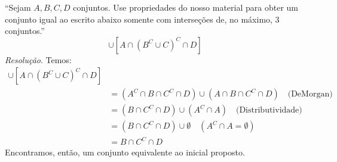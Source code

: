 \enquote{Sejam $A, B, C, D$ conjuntos. Use propriedades do nosso material para obter um conjunto igual ao escrito abaixo somente com interseções de, no máximo, 3 conjuntos.}
\begin{displaymath}
    [A^C \cap B \cap (C \cup D^C)^C] \cup [A \cap (B^C \cup C)^C \cap D]
\end{displaymath}
\emph{Resolução}. Temos:
\begin{align*}
    [A^C \cap B &\cap (C \cup D^C)^C] \cup [A \cap (B^C \cup C)^C \cap D] 
    \\ &=
    (A^C \cap B \cap C^C \cap D) \cup (A \cap B \cap C^C \cap D) \quad \text{(DeMorgan)}
    \\ &=
    (B \cap C^C \cap D) \cup (A^C \cap A) \quad \text{(Distributividade)}
    \\ &=
    (B \cap C^C \cap D) \cup \emptyset \quad (A^C \cap A = \emptyset) 
    \\ &= 
    B \cap C^C \cap D
\end{align*}
Encontramos, então, um conjunto equivalente ao inicial proposto.